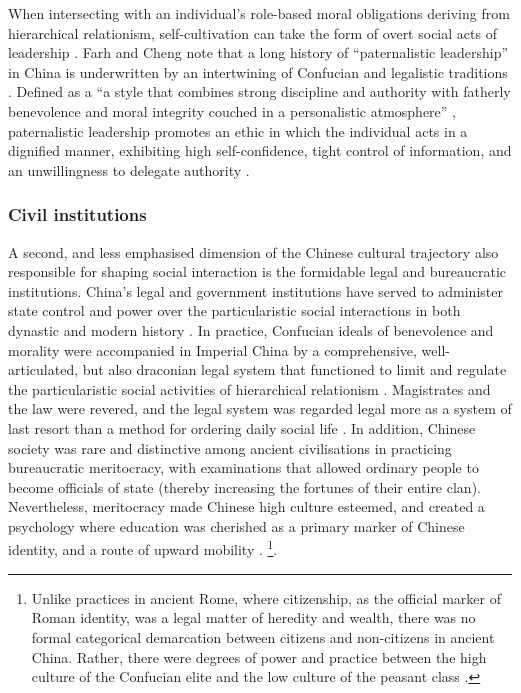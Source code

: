 \begin{CJK}{UTF8}{gbsn}
When intersecting with an individual's role-based moral obligations deriving from hierarchical relationism, self-cultivation can take the form of overt social acts of leadership \citep{Woods2011}.  Farh and Cheng note that a long history of ``paternalistic leadership'' in China is underwritten by an intertwining of Confucian and legalistic traditions \citep{Farh2000}.  Defined as a ``a style that combines strong discipline and authority with fatherly benevolence and moral integrity couched in a personalistic atmosphere'' \citep[91]{Cheng2004}, paternalistic leadership promotes an ethic in which the individual acts in a dignified manner, exhibiting high self-confidence, tight control of information, and an unwillingness to delegate authority \citep{Liu2003}.

\subsubsection{Civil institutions}
A second, and less emphasised dimension of the Chinese cultural trajectory also responsible for shaping social interaction is the formidable legal and bureaucratic institutions.  China's legal and government institutions have served to administer state control and power over the particularistic social interactions in both dynastic and modern history \citep[]{Liu2017}.  In practice, Confucian ideals of benevolence and morality were accompanied in Imperial China by a comprehensive, well-articulated, but also draconian legal system that functioned to limit and regulate the particularistic social activities of hierarchical relationism \citep{Fitzgerald1985}.  Magistrates and the law were revered, and the legal system was regarded legal more as a system of last resort than a method for ordering daily social life \citep{Liu2009}.  In addition, Chinese society was rare and distinctive among ancient civilisations in practicing bureaucratic meritocracy, with examinations that allowed ordinary people to become officials of state (thereby increasing the fortunes of their entire clan).  Nevertheless, meritocracy made Chinese high culture esteemed, and created a psychology where education was cherished as a primary marker of Chinese identity, and a route of upward mobility \citep{Spence1990}. \footnote{Unlike practices in ancient Rome, where citizenship, as the official marker of Roman identity, was a legal matter of heredity and wealth, there was no formal categorical demarcation between citizens and non-citizens in ancient China.  Rather, there were degrees of power and practice between the high culture of the Confucian elite and the low culture of the peasant class \citep[see][]{Liu2014}.}.


\end{CJK}
